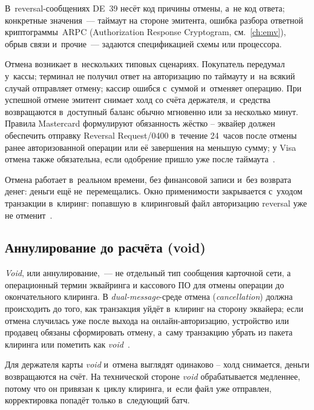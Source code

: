 В~reversal-сообщениях DE~39 несёт код причины отмены, а~не код
ответа; конкретные значения~--- таймаут на стороне эмитента, ошибка
разбора ответной криптограммы~ARPC (Authorization Response
Cryptogram, см.~\autoref{ch:emv}), обрыв связи и~прочие~--- задаются
спецификацией схемы или процессора.

Отмена возникает в~нескольких типовых сценариях. Покупатель передумал
у~кассы; терминал не получил ответ на авторизацию по таймауту
и~на всякий случай отправляет отмену; кассир ошибся с~суммой
и~отменяет операцию. При успешной отмене эмитент снимает холд
со счёта держателя, и~средства возвращаются в~доступный баланс
обычно мгновенно или за несколько минут. Правила Mastercard
формулируют обязанность жёстко -- эквайер должен обеспечить отправку
Reversal Request/0400 в~течение 24~часов после отмены ранее
авторизованной операции или её завершения на меньшую сумму;
у Visa отмена также обязательна, если одобрение пришло уже после
таймаута~\cite{visa-core-rules,visa-tadg,mc-tpr}.

Отмена работает в~реальном времени, без финансовой записи и~без
возврата денег: деньги ещё не~перемещались. Окно применимости
закрывается с~уходом транзакции в~клиринг: попавшую в~клиринговый
файл авторизацию reversal уже не отменит~\cite{mc-rules}.

\subsection*{Аннулирование до расчёта (void)}

\textit{Void}, или аннулирование,~--- не отдельный тип сообщения карточной сети,
а операционный термин эквайринга и кассового ПО для отмены операции
до окончательного клиринга. В \textit{dual-message}-среде отмена
(\textit{cancellation}) должна происходить до того, как транзакция уйдёт
в~клиринг на сторону эквайера; если отмена случилась уже после
выхода на онлайн-авторизацию, устройство или продавец обязаны
сформировать отмену, а~саму транзакцию убрать из пакета клиринга
или пометить как \textit{void}~\cite{visa-tadg}.

Для держателя карты \textit{void} и~отмена выглядят одинаково -- холд снимается,
деньги возвращаются на счёт. На технической стороне \textit{void} обрабатывается
медленнее, потому что он привязан к~циклу клиринга, и~если файл уже отправлен,
корректировка попадёт только в~следующий батч.

